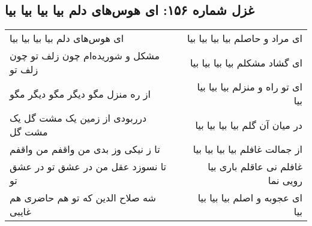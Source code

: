 \begin{center}
\section*{غزل شماره ۱۵۶: ای هوس‌های دلم بیا بیا بیا بیا}
\label{sec:0156}
\begin{longtable}{l p{0.5cm} r}
ای هوس‌های دلم بیا بیا بیا بیا
&&
ای مراد و حاصلم بیا بیا بیا بیا
\\
مشکل و شوریده‌ام چون زلف تو چون زلف تو
&&
ای گشاد مشکلم بیا بیا بیا بیا
\\
از ره منزل مگو دیگر مگو دیگر مگو
&&
ای تو راه و منزلم بیا بیا بیا بیا
\\
درربودی از زمین یک مشت گل یک مشت گل
&&
در میان آن گلم بیا بیا بیا بیا
\\
تا ز نیکی وز بدی من واقفم من واقفم
&&
از جمالت غافلم بیا بیا بیا بیا
\\
تا نسوزد عقل من در عشق تو در عشق تو
&&
غافلم نی عاقلم باری بیا رویی نما
\\
شه صلاح الدین که تو هم حاضری هم غایبی
&&
ای عجوبه و اصلم بیا بیا بیا بیا
\\
\end{longtable}
\end{center}
